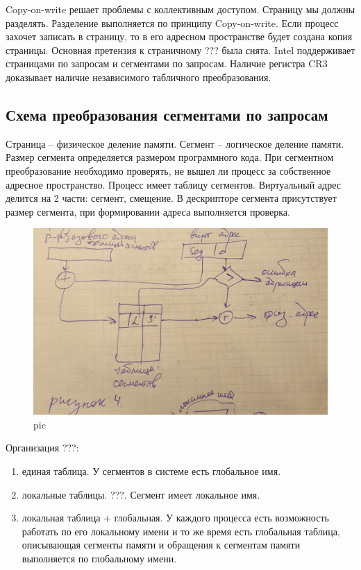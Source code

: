 Copy-on-write решает проблемы с коллективным доступом. Страницу мы должны разделять. Разделение выполняется по принципу Copy-on-write. Если процесс захочет записать в страницу, то в его адресном пространстве будет создана копия страницы. Основная претензия к страничному ??? была снята. Intel поддерживает страницами по запросам и сегментами по запросам. Наличие регистра CR3 доказывает наличие независимого табличного преобразования.

\subsection{Схема преобразования сегментами по запросам}

Страница – физическое деление памяти. Сегмент – логическое деление памяти. Размер сегмента определяется размером программного кода. При сегментном преобразование необходимо проверять, не вышел ли процесс за собственное адресное пространство. Процесс имеет таблицу сегментов. Виртуальный адрес делится на 2 части: сегмент, смещение. В дескрипторе сегмента присутствует размер сегмента, при формировании адреса выполняется проверка.

\begin{figure}[H]
    \centering
    \includegraphics[width=\textwidth]{pic/4.png}
    \caption{pic}
\end{figure}

Организация ???:
\begin{enumerate}
    \item единая таблица. У сегментов в системе есть глобальное имя.
    \item локальные таблицы. ???. Сегмент имеет локальное имя.
    \item локальная таблица + глобальная. У каждого процесса есть возможность работать по его локальному имени и то же время есть глобальная таблица, описывающая сегменты памяти и обращения к сегментам памяти выполняется по глобальному имени.
\end{enumerate} 

